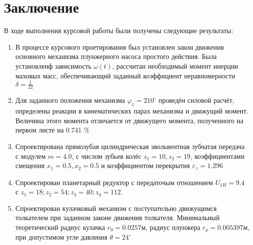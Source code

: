 \section*{Заключение}

В ходе выполнения курсовой работы были получены следующие результаты:

\begin{enumerate}
	\item В процессе курсового проетирования был установлен закон движения основного механизма плунжерного насоса простого действия. Была установленф зависимость $\omega(t)$, рассчитан необходимый момент инерции маховых масс, обеспечивающий заданный коэффициент неравномерности $\delta = \frac{1}{22}$
	
	\item Для заданного положения механизма $\varphi_1 = 210^{\circ}$ проведён силовой расчёт, определены реакции в кинематических парах механизма и движущий момент. Величина этого момента отличается от движущего момента, полученного на первом листе на 0.741 \%
	
	\item Спроектирована прямозубая цилиндрическая эвольвентная зубчатая передача с модулем $m = 4.0$, с числом зубьев колёс $z_1 = 10, z_2 = 19$, коэффициентами смещения $x_1 = 0.5, x_2 = 0.5$ и коэффициентом перекрытия $\varepsilon_{\gamma} = 1.296$
	
	\item Спроектирован планетарный редуктор с передаточым отношением $U_{1H} = 9.4$ с $z_1 = 18; z_2 = 54; z_3 = 40; z_4 = 112$.
	
	\item Спроектирован кулачковый механизм с поступательно движущимся толкателем при заданном законе движения толкателя. Минимальный теоретический радиус кулачка $r_0 = 0.0257 м$, радиус плунжера $r_{p} = 0.005397 м$, при допустимом угле давления $\theta = 24^{\circ}$
\end{enumerate}